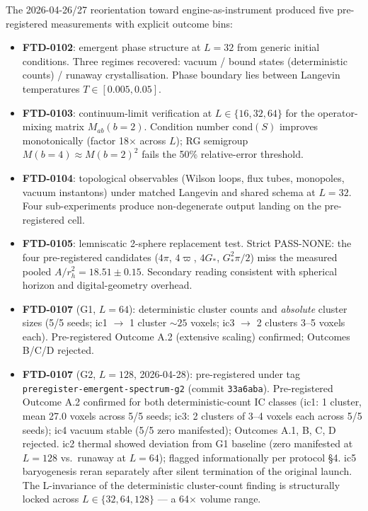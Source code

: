 \documentclass[11pt,reqno]{amsart}
\theoremstyle{plain}
\theoremstyle{definition}
\theoremstyle{remark}
\numberwithin{equation}{section}
\newcommand{\Gstar}{G_{\!*}}
\begin{document}
The 2026-04-26/27 reorientation toward engine-as-instrument
\cite{ledger} produced five pre-registered measurements with
explicit outcome bins:

\begin{itemize}
\item \textbf{FTD-0102}: emergent phase structure at $L = 32$ from
generic initial conditions. Three regimes recovered: vacuum / bound
states (deterministic counts) / runaway crystallisation. Phase
boundary lies between Langevin temperatures $T \in [0.005, 0.05]$.
\item \textbf{FTD-0103}: continuum-limit verification at
$L \in \{16, 32, 64\}$ for the operator-mixing matrix $M_{ab}(b{=}2)$.
Condition number cond$(S)$ improves monotonically (factor 18$\times$
across $L$); RG semigroup $M(b{=}4) \approx M(b{=}2)^{2}$ fails the
50\% relative-error threshold.
\item \textbf{FTD-0104}: topological observables (Wilson loops, flux
tubes, monopoles, vacuum instantons) under matched Langevin and
shared schema at $L = 32$. Four sub-experiments produce
non-degenerate output landing on the pre-registered cell.
\item \textbf{FTD-0105}: lemniscatic 2-sphere replacement test. Strict
PASS-NONE: the four pre-registered candidates ($4\pi$, $4\varpi$,
$4\Gstar$, $\Gstar^{2}\pi/2$) miss the measured pooled
$A/r_{h}^{2} = 18.51 \pm 0.15$. Secondary reading consistent with
spherical horizon and digital-geometry overhead.
\item \textbf{FTD-0107} (G1, $L = 64$): deterministic cluster counts
and \emph{absolute} cluster sizes (5/5 seeds; ic1 $\to$ 1 cluster
$\sim 25$ voxels; ic3 $\to$ 2 clusters 3--5 voxels each).
Pre-registered Outcome A.2 (extensive scaling) confirmed; Outcomes
B/C/D rejected.
\item \textbf{FTD-0107} (G2, $L = 128$, 2026-04-28): pre-registered
under tag \texttt{preregister-emergent-spectrum-g2} (commit
\texttt{33a6aba}). Pre-registered Outcome A.2 confirmed for both
deterministic-count IC classes (ic1: 1 cluster, mean 27.0 voxels
across 5/5 seeds; ic3: 2 clusters of 3--4 voxels each across 5/5
seeds); ic4 vacuum stable (5/5 zero manifested); Outcomes A.1, B,
C, D rejected. ic2 thermal showed deviation from G1 baseline
(zero manifested at $L = 128$ vs.\ runaway at $L = 64$); flagged
informationally per protocol \S 4. ic5 baryogenesis reran separately
after silent termination of the original launch. The L-invariance of
the deterministic cluster-count finding is structurally locked across
$L \in \{32, 64, 128\}$ — a 64$\times$ volume range.
\end{itemize}
\end{document}
